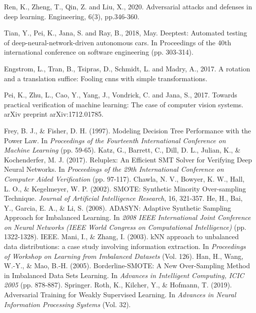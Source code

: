 \begin{singlespace}
\begin{thebibliography}{}
Ren, K., Zheng, T., Qin, Z. and Liu, X., 2020. Adversarial attacks and defenses in deep learning. Engineering, 6(3), pp.346-360.

Tian, Y., Pei, K., Jana, S. and Ray, B., 2018, May. Deeptest: Automated testing of deep-neural-network-driven autonomous cars. In Proceedings of the 40th international conference on software engineering (pp. 303-314).


Engstrom, L., Tran, B., Tsipras, D., Schmidt, L. and Madry, A., 2017. A rotation and a translation suffice: Fooling cnns with simple transformations.

Pei, K., Zhu, L., Cao, Y., Yang, J., Vondrick, C. and Jana, S., 2017. Towards practical verification of machine learning: The case of computer vision systems. arXiv preprint arXiv:1712.01785.





     Frey, B. J., \& Fisher, D. H. (1997). Modeling Decision Tree Performance with the Power Law. In \textit{Proceedings of the Fourteenth International Conference on Machine Learning} (pp. 59-65).
     Katz, G., Barrett, C., Dill, D. L., Julian, K., \& Kochenderfer, M. J. (2017). Reluplex: An Efficient SMT Solver for Verifying Deep Neural Networks. In \textit{Proceedings of the 29th International Conference on Computer Aided Verification} (pp. 97-117).
     Chawla, N. V., Bowyer, K. W., Hall, L. O., \& Kegelmeyer, W. P. (2002). SMOTE: Synthetic Minority Over-sampling Technique. \textit{Journal of Artificial Intelligence Research}, 16, 321-357.
     He, H., Bai, Y., Garcia, E. A., \& Li, S. (2008). ADASYN: Adaptive Synthetic Sampling Approach for Imbalanced Learning. In \textit{2008 IEEE International Joint Conference on Neural Networks (IEEE World Congress on Computational Intelligence)} (pp. 1322-1328). IEEE.
     Mani, I., \& Zhang, I. (2003). kNN approach to unbalanced data distributions: a case study involving information extraction. In \textit{Proceedings of Workshop on Learning from Imbalanced Datasets} (Vol. 126).
     Han, H., Wang, W.-Y., \& Mao, B.-H. (2005). Borderline-SMOTE: A New Over-Sampling Method in Imbalanced Data Sets Learning. In \textit{Advances in Intelligent Computing, ICIC 2005} (pp. 878-887). Springer.
     Roth, K., Kilcher, Y., \& Hofmann, T. (2019). Adversarial Training for Weakly Supervised Learning. In \textit{Advances in Neural Information Processing Systems} (Vol. 32).



\end{thebibliography}
\end{singlespace}
